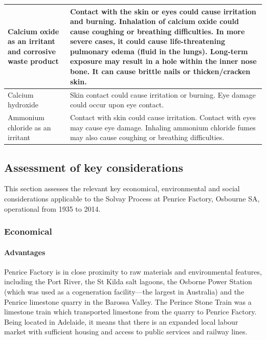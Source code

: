 \documentclass[12pt, a4paper]{article}
\begin{document}
\begin{table}[H]
\begin{tabular}{|p{5cm}|p{12cm}|}
Calcium oxide as an irritant and corrosive waste product & Contact with the skin or eyes could cause irritation and burning. Inhalation of calcium oxide could cause coughing or breathing difficulties.  In more severe cases, it could cause life-threatening pulmonary edema (fluid in the lungs). Long-term exposure may result in a hole within the inner nose bone. It can cause brittle nails or thicken/cracken skin. \\  \hline
Calcium hydroxide                & Skin contact could cause irritation or burning. Eye damage could occur upon eye contact.                                                                                                                                                                                                                                                                                                                   \\  \hline
Ammonium chloride as an irritant              & Contact with skin could cause irritation. Contact with eyes may cause eye damage. Inhaling ammonium chloride fumes may also cause coughing or breathing difficulties.

\\ \hline                                                 

\end{tabular}
\end{table}

\pagebreak

\subsection{Assessment of key considerations}

This section assesses the relevant key economical, environmental and social considerations applicable to the Solvay Process at Penrice Factory, Osbourne SA, operational from 1935 to 2014.

\subsubsection{Economical}

\paragraph{Advantages}
Penrice Factory is in close proximity to raw materials and environmental features, including the Port River, the St Kilda salt lagoons, the Osborne Power Station (which was used as a cogeneration facility—the largest in Australia) and the Penrice limestone quarry in the Barossa Valley. The Perince Stone Train was a limestone train which transported limestone from the quarry to Penrice Factory. Being located in Adelaide, it means that there is an expanded local labour market with sufficient housing and access to public services and railway lines.
\end{document}
